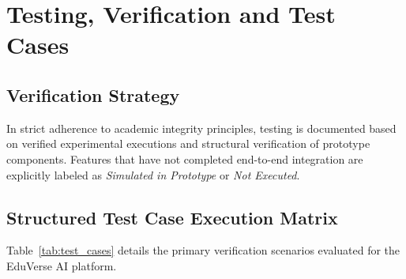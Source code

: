 \documentclass[11pt,a4paper]{report}
\begin{document}
\chapter{Testing, Verification and Test Cases}
\label{ch:testing}

\section{Verification Strategy}
In strict adherence to academic integrity principles, testing is documented based on verified experimental executions and structural verification of prototype components. Features that have not completed end-to-end integration are explicitly labeled as \textit{Simulated in Prototype} or \textit{Not Executed}.

\section{Structured Test Case Execution Matrix}
Table~\ref{tab:test_cases} details the primary verification scenarios evaluated for the EduVerse AI platform.
\end{document}
